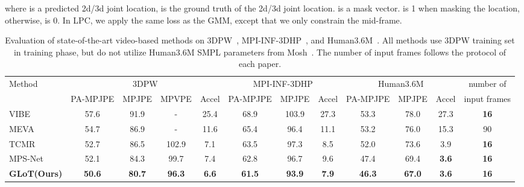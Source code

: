 \documentclass[10pt,twocolumn,letterpaper]{article}
\begin{document}
	where  is a predicted 2d/3d joint location,  is the ground truth of the 2d/3d joint location.  is a mask vector.  is 1 when masking the  location, otherwise,  is 0.
	In LPC, we apply the same loss as the GMM, except that we only constrain the mid-frame.
	
	\begin{table*}[htb]
		\small
		\setlength{\tabcolsep}{1.4 pt}
\centering
		
\begin{tabular}{l|cccc|ccc|ccc|c}
				\toprule[2pt]
				\multirow{2}{*}{Method}& \multicolumn{4}{c|}{3DPW} & \multicolumn{3}{c|}{MPI-INF-3DHP} & \multicolumn{3}{c|}{Human3.6M} & \multicolumn{1}{c}{number of} \\
& PA-MPJPE  & MPJPE  & MPVPE  & Accel  & PA-MPJPE  & MPJPE  & Accel  & PA-MPJPE  & MPJPE  & Accel  & input frames \\
				\midrule[1pt]
				\midrule[1pt]
				VIBE~\cite{VIBE} & 57.6 & 91.9 & - & 25.4 & 68.9 & 103.9 & 27.3 & 53.3 & 78.0 & 27.3 & \textbf{16} \\
				\cellcolor{Gray}MEVA~\cite{MEVA} & \cellcolor{Gray}54.7 &\cellcolor{Gray}86.9 &\cellcolor{Gray}- & \cellcolor{Gray}11.6 & \cellcolor{Gray}65.4 & \cellcolor{Gray}96.4 & \cellcolor{Gray}11.1 & \cellcolor{Gray}53.2 & \cellcolor{Gray}76.0 & \cellcolor{Gray}15.3 & \cellcolor{Gray}90 \\
				TCMR~\cite{TCMR} & 
				52.7 & 
				86.5 & 102.9& 
				7.1 & 
				63.5& 
				97.3 & 
				8.5 & 
				52.0 & {73.6} & {3.9} & 
				\textbf{16} \\
				\cellcolor{Gray}MPS-Net~\cite{MPS-net} & 
				\cellcolor{Gray}52.1 & \cellcolor{Gray}84.3 & \cellcolor{Gray}99.7& \cellcolor{Gray}7.4 & 
				\cellcolor{Gray}62.8 &\cellcolor{Gray} 96.7 & \cellcolor{Gray}9.6 &
				\cellcolor{Gray}47.4 &\cellcolor{Gray} 69.4 & \cellcolor{Gray}\textbf{3.6} & \cellcolor{Gray}\textbf{16} \\
				\textbf{GLoT(Ours)} &
\textbf{50.6} & \textbf{80.7} & \textbf{96.3}& \textbf{6.6} & 
\textbf{61.5} &
				\textbf{93.9} & \textbf{7.9} &
\textbf{46.3} & \textbf{67.0} & \textbf{3.6} & \textbf{16}
				\\
				\bottomrule[1pt]


			\end{tabular}\vspace{-0.5 em}
		\caption{
			Evaluation of state-of-the-art video-based methods on 3DPW~\cite{3DPW}, MPI-INF-3DHP~\cite{MPS-net}, and Human3.6M~\cite{H36M}. 
			All methods use 3DPW training set in training phase, but do not utilize Human3.6M SMPL parameters from Mosh~\cite{Mosh}.
			The number of input frames follows the protocol of each paper.
		}
		\vspace{-1.em}
		\label{tab:sota_video}
	\end{table*}
\end{document}
